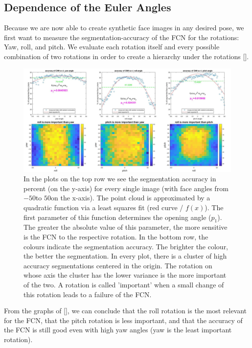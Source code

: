 \subsection{Dependence of the Euler Angles}
Because we are now able to create synthetic face images in any desired pose, we first want to measure the segmentation-accuracy of the FCN for the rotations: Yaw, roll, and pitch. We evaluate each rotation itself and every possible combination of two rotations in order to create a hierarchy under the rotations [].\\

\begin{figure}[H]
	\centering
	\includegraphics[width=\textwidth]{Figures/evaluation_angles.png}
	\caption{In the plots on the top row we see the segmentation accuracy in percent (on the y-axis) for every single image (with face angles from $-50$\textdegree to $50$\textdegree on the x-axis). The point cloud is approximated by a quadratic function via a least squares fit (red curve / $f(x)$). The first parameter of this function determines the opening angle ($p_1$). The greater the absolute value of this parameter, the more sensitive is the FCN to the respective rotation. In the bottom row, the colours indicate the segmentation accuracy. The brighter the colour, the better the segmentation. In every plot, there is a cluster of high accuracy segmentations centered in the origin. The rotation on whose axis the cluster has the lower variance is the more important of the two. A rotation is called 'important' when a small change of this rotation leads to a failure of the FCN.}
	\label{fig:evaluation_angles}
\end{figure}

From the graphs of [], we can conclude that the roll rotation is the most relevant for the FCN, that the pitch rotation is less important, and that the accuracy of the FCN is still good even with high yaw angles (yaw is the least important rotation). 

